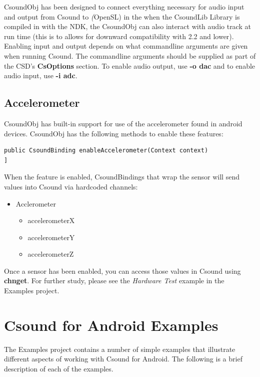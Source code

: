 \documentclass[11pt]{article}
\begin{document}
CsoundObj has been designed to connect everything necessary for audio input and output from Csound to \textit(OpenSL) in the when the CsoundLib Library is compiled in with the NDK, the CsoundObj can also interact with audio track at run time (this is to allows for  downward compatibility with 2.2 and lower).  Enabling input and output depends on what commandline arguments are given when running Csound.  The commandline arguments should be supplied as part of the CSD's \textbf{CsOptions} section.  To enable audio output, use \textbf{-o dac} and to enable audio input, use \textbf{-i adc}. 

\subsection{Accelerometer}

CsoundObj has built-in support for use of the accelerometer found in android devices. CsoundObj has the following methods to enable these features:


\begin{lstlisting}[caption=CsoundObj Accelerometer Method]
public CsoundBinding enableAccelerometer(Context context)
]
\end{lstlisting}

When the feature is enabled, CsoundBindings that wrap the sensor will send values into Csound via hardcoded channels:

\begin{itemize}

\item Acclerometer
\begin{itemize}
\item accelerometerX
\item accelerometerY
\item accelerometerZ
\end{itemize}

\end{itemize} 

Once a sensor has been enabled, you can access those values in Csound using \textbf{chnget}. For further study, please see the \emph{Hardware Test} example in the Examples project. 


\section{Csound for Android Examples}

The Examples project contains a number of simple examples that illustrate different aspects of working with Csound for Android.  The following is a brief description of each of the examples.
\end{document}
